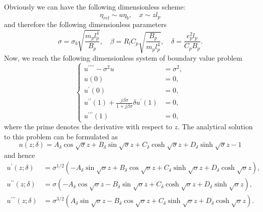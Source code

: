\documentclass{article}
\begin{document}
Obviously we can have the following dimensionless scheme:
\begin{equation}
    \eta_{rel} \sim u \eta_b ,\quad x \sim z l_p 
\end{equation}
and therefore the following dimensionless parameters
\begin{equation}
    \sigma = \sigma_b \sqrt{\frac{m_p l_p^4}{B_p}}, \quad \beta = R_l C_p \sqrt{\frac{B_p}{m_p l_p^4}}, \quad \delta = \frac{e_p^2 l_p}{C_p B_p}.
\end{equation}
Now, we reach the following dimensionless system of boundary value problem
\begin{equation}
    \left\{\begin{aligned}
        u^{\prime\prime\prime\prime} -\sigma^2 u &= \sigma^2, \\
        u(0) &= 0, \\
        u^{\prime}(0) &= 0, \\
        u^{\prime\prime}(1)  + \frac{j \beta \sigma }{1 + j \beta \sigma } \delta u^{\prime}(1) &= 0, \\
        u^{\prime\prime\prime}(1) &= 0,
    \end{aligned}\right.
\end{equation}
where the prime denotes the derivative with respect to $z$. The analytical solution to this problem can be formulated as
\begin{equation}
    u(z;\delta) = A_\delta \cos{\sqrt{\sigma}z} + B_\delta \sin{\sqrt{\sigma}z} + C_\delta \cosh{\sqrt{\sigma}z} + D_\delta \sinh{\sqrt{\sigma}z} - 1
    \label{eq:eq_disp_func_general_coeffs}
\end{equation}
and hence
\begin{equation}
    \begin{aligned}
        u^{\prime}(z;\delta) &= \sigma^{1/2} \left( - A_\delta \sin{\sqrt{\sigma}z} + B_\delta \cos{\sqrt{\sigma}z} + C_\delta \sinh{\sqrt{\sigma}z} + D_\delta \cosh{\sqrt{\sigma}z} \right), \\
        u^{\prime\prime}(z;\delta) &= \sigma  \left( - A_\delta \cos{\sqrt{\sigma}z} - B_\delta \sin{\sqrt{\sigma}z} + C_\delta \cosh{\sqrt{\sigma}z} + D_\delta \sinh{\sqrt{\sigma}z} \right), \\
        u^{\prime\prime\prime}(z;\delta) &= \sigma^{3/2} \left( A_\delta \sin{\sqrt{\sigma}z} - B_\delta \cos{\sqrt{\sigma}z} + C_\delta \sinh{\sqrt{\sigma}z} + D_\delta \cosh{\sqrt{\sigma}z} \right). 
    \end{aligned}
\end{equation}
\end{document}
